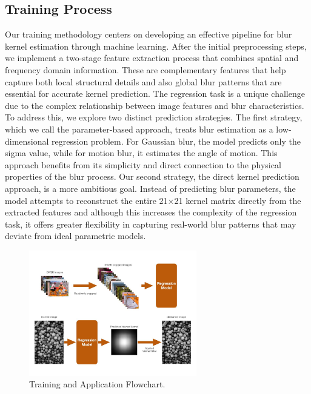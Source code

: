 \documentclass[twoside,11pt]{article}
\begin{document}
\subsection{Training Process}
Our training methodology centers on developing an effective pipeline for blur kernel estimation through machine learning. After the initial preprocessing steps, we implement a two-stage feature extraction process that combines spatial and frequency domain information. These are complementary features that help capture both local structural details and also global blur patterns that are essential for accurate kernel prediction.
The regression task is a unique challenge due to the complex relationship between image features and blur characteristics. To address this, we explore two distinct prediction strategies. The first strategy, which we call the parameter-based approach, treats blur estimation as a low-dimensional regression problem. For Gaussian blur, the model predicts only the sigma value, while for motion blur, it estimates the angle of motion. This approach benefits from its simplicity and direct connection to the physical properties of the blur process.
Our second strategy, the direct kernel prediction approach, is a more ambitious goal. Instead of predicting blur parameters, the model attempts to reconstruct the entire 21×21 kernel matrix directly from the extracted features and although this increases the complexity of the regression task, it offers greater flexibility in capturing real-world blur patterns that may deviate from ideal parametric models.

\begin{figure}[H]
\centering
\includegraphics[width=0.65\textwidth]{figure6.jpg}
\caption{Training and Application Flowchart.}
\end{figure}
\end{document}

